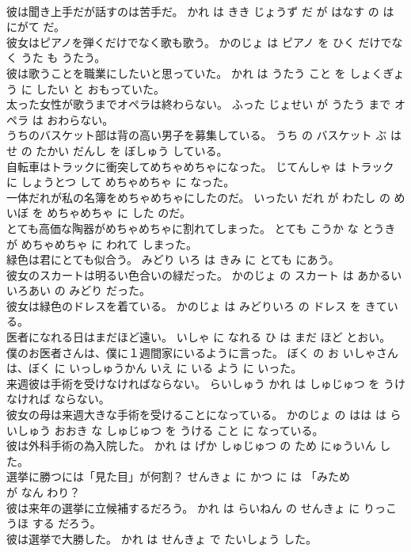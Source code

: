 \documentclass[8pt]{extreport}
\begin{document}
\begin{CJK}{UTF8}{min}
\\	彼は聞き上手だが話すのは苦手だ。	かれ は きき じょうず だ が はなす の は にがて だ。	
\\	彼女はピアノを弾くだけでなく歌も歌う。	かのじょ は ピアノ を ひく だけでなく うた も うたう。	
\\	彼は歌うことを職業にしたいと思っていた。	かれ は うたう こと を しょくぎょう に したい と おもっていた。	
\\	太った女性が歌うまでオペラは終わらない。	ふった じょせい が うたう まで オペラ は おわらない。	
\\	うちのバスケット部は背の高い男子を募集している。	うち の バスケット ぶ は せ の たかい だんし を ぼしゅう している。	
\\	自転車はトラックに衝突してめちゃめちゃになった。	じてんしゃ は トラック に しょうとつ して めちゃめちゃ に なった。	
\\	一体だれが私の名簿をめちゃめちゃにしたのだ。	いったい だれ が わたし の めいぼ を めちゃめちゃ に した のだ。	
\\	とても高価な陶器がめちゃめちゃに割れてしまった。	とても こうか な とうき が めちゃめちゃ に われて しまった。	
\\	緑色は君にとても似合う。	みどり いろ は きみ に とても にあう。	
\\	彼女のスカートは明るい色合いの緑だった。	かのじょ の スカート は あかるい いろあい の みどり だった。	
\\	彼女は緑色のドレスを着ている。	かのじょ は みどりいろ の ドレス を きている。	
\\	医者になれる日はまだほど遠い。	いしゃ に なれる ひ は まだ ほど とおい。	
\\	僕のお医者さんは、僕に１週間家にいるように言った。	ぼく の お いしゃさん は、ぼく に いっしゅうかん いえ に いる よう に いった。	
\\	来週彼は手術を受けなければならない。	らいしゅう かれ は しゅじゅつ を うけ なければ ならない。	
\\	彼女の母は来週大きな手術を受けることになっている。	かのじょ の はは は らいしゅう おおき な しゅじゅつ を うける こと に なっている。	
\\	彼は外科手術の為入院した。	かれ は げか しゅじゅつ の ため にゅういん した。	
\\	選挙に勝つには「見た目」が何割？	せんきょ に かつ に は 「みため 
\\	が なん わり？	
\\	彼は来年の選挙に立候補するだろう。	かれ は らいねん の せんきょ に りっこうほ する だろう。	
\\	彼は選挙で大勝した。	かれ は せんきょ で たいしょう した。	

\end{CJK}
\end{document}
